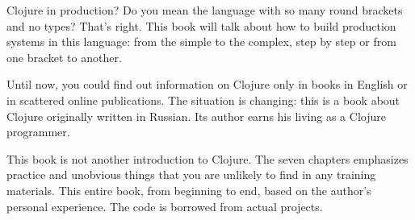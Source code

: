 Clojure in production? Do you mean the language with so many round brackets and no types? That's right. This book will talk about how to build production systems in this language: from the simple to the complex, step by step or from one bracket to another.

Until now, you could find out information on Clojure only in books in English or in scattered online publications. The situation is changing: this is a book about Clojure originally written in Russian. Its author earns his living as a Clojure programmer.

This book is not another introduction to Clojure. The seven chapters emphasizes practice and unobvious things that you are unlikely to find in any training materials. This entire book, from beginning to end, based on the author's personal experience. The code is borrowed from actual projects.
